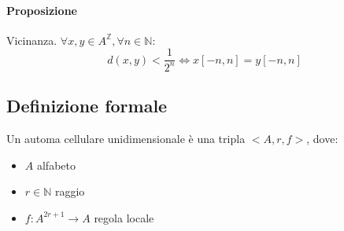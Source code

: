 \documentclass[12pt]{article}
\begin{document}
\paragraph{Proposizione} Vicinanza. $\forall x,y \in A^\mathds{Z}, \forall n \in \mathds{N}:$
\begin{equation}   d(x,y) < \frac{1}{2^n} \iff x[-n,n] = y[-n,n]
\end{equation}

\subsection{Definizione formale}

Un automa cellulare unidimensionale è una tripla $<A, r, f>$, dove:

\begin{itemize}
	\item $A$ alfabeto
	\item $r \in \mathds{N}$ raggio
	\item $f: A^{2r+1} \rightarrow A$ regola locale
	\end{itemize}
\end{document}
